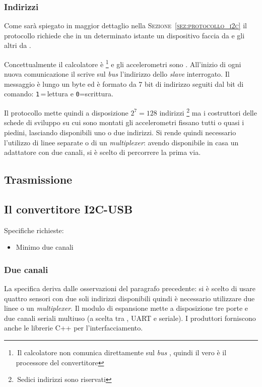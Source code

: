     
	\subsubsection {Indirizzi} \label{sssez:indirizzi}
    Come sarà spiegato in maggior dettaglio nella \textsc{Sezione~\ref{sez:protocollo_i2c}}
    il protocollo {\iic} richiede che in un determinato istante
    un dispositivo faccia da {\master} e gli altri da {\slave}.
    
    Concettualmente il calcolatore è {\master}
    \footnote{\,Il calcolatore non comunica direttamente sul \textit{bus} {\iic},
    quindi il vero {\master} è il processore del convertitore}
    e gli accelerometri sono {\slave}.
    All'inizio di ogni nuova comunicazione il \master{}
    scrive sul \textit{bus} l'indirizzo dello \textit{slave} interrogato.
    Il messaggio è lungo un byte ed è formato da 7 bit di indirizzo
    seguiti dal bit di comando: \texttt{1}\,=\,lettura e \texttt{0}=scrittura.
    
Il protocollo \iic{} mette quindi a disposizione
    \(2^7=128\) indirizzi \footnote{\,Sedici indirizzi sono riservati}
    ma i costruttori delle schede di sviluppo su cui sono montati gli accelerometri
    fissano tutti o quasi i piedini, lasciando disponibili uno o due indirizzi.
    Si rende quindi necessario l'utilizzo di linee separate o di un \textit{multiplexer}: avendo disponibile in casa un adattatore con due canali,
    si è scelto di percorrere la prima via.








\subsection{Trasmissione}
\label{ssez:trasmissione}



\subsection{Il convertitore I2C-USB}
    Specifiche richieste:
	\begin{itemize}
	  \item Minimo due canali
	\end{itemize}

    \subsubsection{Due canali} \label{sssez:2canali}
    La specifica deriva dalle osservazioni del paragrafo precedente:
    si è scelto di usare quattro sensori con due soli indirizzi disponibili
    quindi è necessario utilizzare due linee o un \textit{multiplexer}.
    Il modulo di espansione \emph{} mette a disposizione
    tre porte \usb{} e due canali seriali multiuso
    (a scelta tra \iic{}, { UART} e seriale).
    I produttori forniscono anche le librerie { C++} per l'interfacciamento.
    
